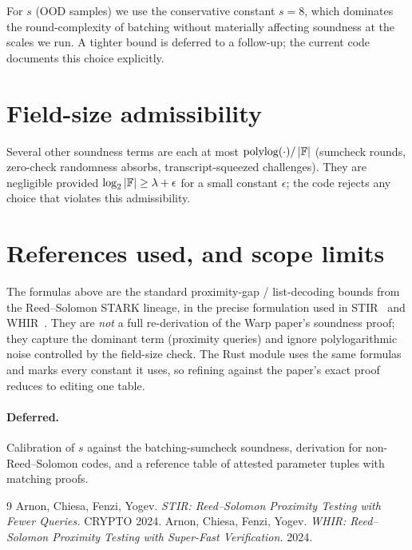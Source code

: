 \documentclass{article}
\begin{document}
For \(s\) (OOD samples) we use the conservative constant \(s = 8\),
which dominates the round-complexity of batching without materially
affecting soundness at the scales we run. A tighter bound is deferred to
a follow-up; the current code documents this choice explicitly.

\section{Field-size admissibility}

Several other soundness terms are each at most
\(\mathrm{polylog}(\cdot) / \left\lvert\mathbb{F}\right\rvert\) (sumcheck rounds, zero-check
randomness absorbs, transcript-squeezed challenges). They are negligible
provided \(\log_2 \left\lvert\mathbb{F}\right\rvert \geq \lambda + \epsilon\) for a small constant
\(\epsilon\); the code rejects any choice that violates this admissibility.

\section{References used, and scope limits}

The formulas above are the standard proximity-gap / list-decoding bounds
from the Reed--Solomon STARK lineage, in the precise formulation used in
STIR~\cite{STIR} and WHIR~\cite{WHIR}. They are \emph{not} a full
re-derivation of the Warp paper's soundness proof; they capture the
dominant term (proximity queries) and ignore polylogarithmic noise
controlled by the field-size check. The Rust module
 uses the same formulas and marks every constant
it uses, so refining against the paper's exact proof reduces to editing
one table.

\paragraph{Deferred.} Calibration of \(s\) against the batching-sumcheck
soundness, derivation for non-Reed--Solomon codes, and a reference
table of attested parameter tuples with matching proofs.

\begin{thebibliography}{9}
  Arnon, Chiesa, Fenzi, Yogev.
  \emph{STIR: Reed--Solomon Proximity Testing with Fewer Queries.}
  CRYPTO 2024.
  Arnon, Chiesa, Fenzi, Yogev.
  \emph{WHIR: Reed--Solomon Proximity Testing with Super-Fast Verification.}
  2024.
\end{thebibliography}
\end{document}
